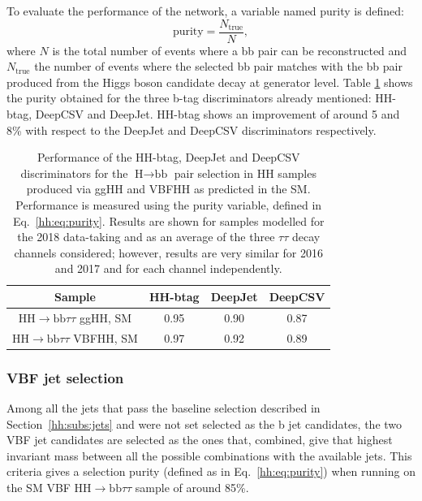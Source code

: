 \documentclass[../main.tex]{subfiles}
\begin{document}
To evaluate the performance of the network, a variable named purity is defined:
\begin{equation}
	\text{purity} = \frac{N_{\text{true}}}{N},
	\label{hh:eq:purity}
\end{equation}
where $N$ is the total number of events where a bb pair can be reconstructed and $N_{\text{true}}$ the number of events where the selected bb pair matches with the bb pair produced from the Higgs boson candidate decay at generator level. Table \ref{hh:tab:hhbtag_purity} shows the purity obtained for the three b-tag discriminators already mentioned: HH-btag, DeepCSV and DeepJet. HH-btag shows an improvement of around 5 and 8\% with respect to the DeepJet and DeepCSV discriminators respectively.

\begin{table}[h!]
	\begin{center}
	\begin{tabular}{c | c | c | c}
		Sample & HH-btag & DeepJet & DeepCSV \\
		\hline
		$\text{HH}\to\text{bb}\tau\tau$	ggHH, SM & 0.95 & 0.90 & 0.87 \\
		$\text{HH}\to\text{bb}\tau\tau$	VBFHH, SM & 0.97 & 0.92 & 0.89			
	\end{tabular}	
	\end{center}
\caption{Performance of the HH-btag, DeepJet and DeepCSV discriminators for the $\text{H}\to\text{bb}$ pair selection in HH samples produced via ggHH and VBFHH as predicted in the SM. Performance is measured using the purity variable, defined in Eq.~\eqref{hh:eq:purity}. Results are shown for samples modelled for the 2018 data-taking and as an average of the three $\tau\tau$ decay channels considered; however, results are very similar for 2016 and 2017 and for each channel independently.}
\label{hh:tab:hhbtag_purity}
\end{table}

\subsubsection{VBF jet selection}

Among all the jets that pass the baseline selection described in Section~\ref{hh:subs:jets} and were not set selected as the b jet candidates, the two VBF jet candidates are selected as the ones that, combined, give that highest invariant mass between all the possible combinations with the available jets. This criteria gives a selection purity (defined as in Eq.~\ref{hh:eq:purity}) when running on the SM VBF $\text{HH}\to\text{bb}\tau\tau$ sample of around 85\%.
\end{document}
